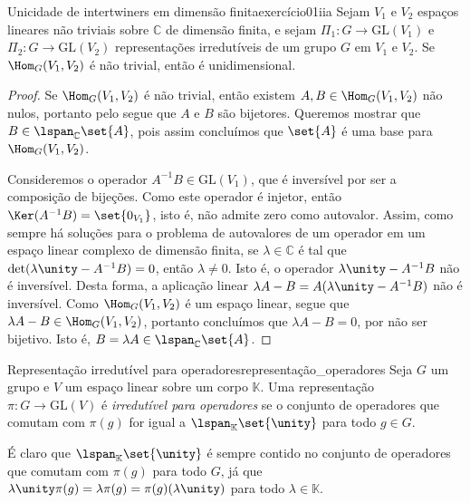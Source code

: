 \begin{proposition}{Unicidade de intertwiners em dimensão finita}{exercício01iia}
    Sejam \(V_1\) e \(V_2\) espaços lineares não triviais sobre \(\mathbb{C}\) de dimensão finita, e sejam \(\Pi_1 : G \to \mathrm{GL}(V_1)\) e \(\Pi_2 : G \to \mathrm{GL}(V_2)\) representações irredutíveis de um grupo \(G\) em \(V_1\) e \(V_2\). Se \(\Hom_G(V_1, V_2)\) é não trivial, então é unidimensional.
\end{proposition}
\begin{proof}
    Se \(\Hom_G(V_1, V_2)\) é não trivial, então existem \(A, B \in \Hom_G(V_1, V_2)\) não nulos, portanto pelo  segue que \(A\) e \(B\) são bijetores. Queremos mostrar que \(B \in \lspan_{\mathbb{C}}\set{A}\), pois assim concluímos que \(\set{A}\) é uma base para \(\Hom_G(V_1, V_2)\).

    Consideremos o operador \(A^{-1} B \in \mathrm{GL}(V_1)\), que é inversível por ser a composição de bijeções. Como este operador é injetor, então \(\Ker(A^{-1} B) = \set{0_{V_1}}\), isto é, não admite zero como autovalor. Assim, como sempre há soluções para o problema de autovalores de um operador em um espaço linear complexo de dimensão finita, se \(\lambda \in \mathbb{C}\) é tal que \(\det(\lambda \unity - A^{-1} B) = 0\), então \(\lambda \neq 0\). Isto é, o operador \(\lambda\unity - A^{-1} B\) não é inversível. Desta forma, a aplicação linear \(\lambda A - B = A(\lambda \unity - A^{-1} B)\) não é inversível. Como \(\Hom_{G}(V_1, V_2)\) é um espaço linear, segue que \(\lambda A - B \in \Hom_{G}(V_1, V_2)\), portanto concluímos que \(\lambda A - B = 0\), por não ser bijetivo. Isto é, \(B = \lambda A \in \lspan_{\mathbb{C}}\set{A}\).
\end{proof}

\begin{definition}{Representação irredutível para operadores}{representação_operadores}
    Seja \(G\) um grupo e \(V\) um espaço linear sobre um corpo \(\mathbb{K}\). Uma representação \(\pi : G \to \mathrm{GL}(V)\) é \emph{irredutível para operadores} se o conjunto de operadores que comutam com \(\pi(g)\) for igual a \(\lspan_{\mathbb{K}}\set{\unity}\) para todo \(g \in G\).
\end{definition}
\begin{remark}
    É claro que \(\lspan_{\mathbb{K}}\set{\unity}\) é sempre contido no conjunto de operadores que comutam com \(\pi(g)\) para todo \(G\), já que \(\lambda \unity \pi(g) = \lambda \pi(g) = \pi(g) (\lambda \unity)\) para todo \(\lambda \in \mathbb{K}\).
\end{remark}

